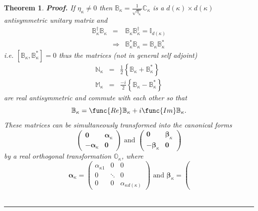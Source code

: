 \documentclass[aps,preprint]{revtex4}
\newtheorem{theorem}{Theorem}
\newenvironment{proof}[1][Proof]{\noindent\textbf{#1.} }{\ \rule{0.5em}{0.5em}}
\begin{document}
\begin{theorem}
\begin{proof}
If $\eta _{\kappa }\neq 0$ then $\mathbb{B}_{\kappa }=\frac{1}{\sqrt{\eta
_{\kappa }}}\mathbb{C}_{\kappa }$ is a $d\left( \kappa \right) \times
d\left( \kappa \right) $ antisymmetric unitary matrix and 
\begin{eqnarray}
\mathbb{B}_{\kappa }^{\dagger }\mathbb{B}_{\kappa } &=&\mathbb{B}_{\kappa }%
\mathbb{B}_{\kappa }^{\dagger }=\mathbb{I}_{d\left( \kappa \right) } 
\nonumber \\
&\Rightarrow &\mathbb{B}_{\kappa }^{\ast }\mathbb{B}_{\kappa }=\mathbb{B}%
_{\kappa }\mathbb{B}_{\kappa }^{\ast }
\end{eqnarray}%
i.e. $\left[ \mathbb{B}_{\kappa },\mathbb{B}_{\kappa }^{\ast }\right] =0$
thus the matrices (\emph{not in general} self adjoint) 
\begin{eqnarray}
\mathbb{N}_{\kappa } &=&\frac{1}{2}\left\{ \mathbb{B}_{\kappa }+\mathbb{B}%
_{\kappa }^{\ast }\right\}  \nonumber \\
\mathbb{M}_{\kappa } &=&\frac{-i}{2}\left\{ \mathbb{B}_{\kappa }-\mathbb{B}%
_{\kappa }^{\ast }\right\}
\end{eqnarray}%
are real antisymmetric and \emph{commute }with each other so that 
\begin{equation}
\mathbb{B}_{\kappa }=\func{Re}\mathbb{B}_{\kappa }+i\func{Im}\mathbb{B}%
_{\kappa }.
\end{equation}
These matrices can be simultaneously transformed into the canonical forms 
\begin{equation}
\left( 
\begin{array}{cc}
\mathbf{0} & \mathbf{\alpha }_{\kappa } \\ 
-\mathbf{\alpha }_{\kappa } & \mathbf{0}%
\end{array}%
\right) \text{ and }\left( 
\begin{array}{cc}
\mathbf{0} & \mathbf{\beta }_{\kappa } \\ 
-\mathbf{\beta }_{\kappa } & \mathbf{0}%
\end{array}%
\right)
\end{equation}%
by a real orthogonal transformation $\mathbb{O}_{\kappa }$, where 
\begin{equation}
\mathbf{\alpha }_{\kappa }=\left( 
\begin{array}{ccc}
\alpha _{\kappa 1} & 0 & 0 \\ 
0 & \ddots & 0 \\ 
0 & 0 & \alpha _{\kappa d\left( \kappa \right) }%
\end{array}%
\right) \text{ and }\mathbf{\beta }_{\kappa }=\left( 

\end{equation}
\end{proof}
\end{theorem}
\end{document}
